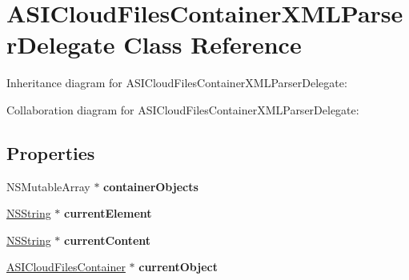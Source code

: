 \hypertarget{interface_a_s_i_cloud_files_container_x_m_l_parser_delegate}{
\section{\-A\-S\-I\-Cloud\-Files\-Container\-X\-M\-L\-Parser\-Delegate \-Class \-Reference}
\label{interface_a_s_i_cloud_files_container_x_m_l_parser_delegate}
}


\-Inheritance diagram for \-A\-S\-I\-Cloud\-Files\-Container\-X\-M\-L\-Parser\-Delegate\-:


\-Collaboration diagram for \-A\-S\-I\-Cloud\-Files\-Container\-X\-M\-L\-Parser\-Delegate\-:
\subsection*{\-Properties}
\begin{DoxyCompactItemize}
\item 
\hypertarget{interface_a_s_i_cloud_files_container_x_m_l_parser_delegate_ad42f611bc16b67d44317a8b600e08fbe}{
\-N\-S\-Mutable\-Array $\ast$ {\bfseries container\-Objects}}
\label{interface_a_s_i_cloud_files_container_x_m_l_parser_delegate_ad42f611bc16b67d44317a8b600e08fbe}

\item 
\hypertarget{interface_a_s_i_cloud_files_container_x_m_l_parser_delegate_a28ad858020eff3bf1a35c6e0e4949c91}{
\hyperlink{class_n_s_string}{\-N\-S\-String} $\ast$ {\bfseries current\-Element}}
\label{interface_a_s_i_cloud_files_container_x_m_l_parser_delegate_a28ad858020eff3bf1a35c6e0e4949c91}

\item 
\hypertarget{interface_a_s_i_cloud_files_container_x_m_l_parser_delegate_aeb94d74e64650766a42168b2c9af3761}{
\hyperlink{class_n_s_string}{\-N\-S\-String} $\ast$ {\bfseries current\-Content}}
\label{interface_a_s_i_cloud_files_container_x_m_l_parser_delegate_aeb94d74e64650766a42168b2c9af3761}

\item 
\hypertarget{interface_a_s_i_cloud_files_container_x_m_l_parser_delegate_a1e40f77ff0700cc2e8aa9fe8703f354a}{
\hyperlink{interface_a_s_i_cloud_files_container}{\-A\-S\-I\-Cloud\-Files\-Container} $\ast$ {\bfseries current\-Object}}
\label{interface_a_s_i_cloud_files_container_x_m_l_parser_delegate_a1e40f77ff0700cc2e8aa9fe8703f354a}

\end{DoxyCompactItemize}


